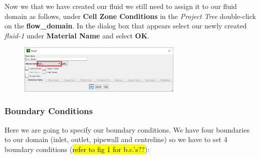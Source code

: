 \documentclass[11pt,a4paper,oneside,hidelinks]{scrartcl}
\newcommand\bfr[1]{\textcolor[rgb]{1,0.00,0.00}{\textbf{\textsf{#1}}}}
\begin{document}
Now we that we have created our fluid we still need to assign it to our fluid domain as follows, under \bfr{Cell Zone Conditions} in the \emph{Project Tree} double-click on the \bfr{flow\_domain}. In the dialog box that appears select our newly created \emph{fluid-1} under \bfr{Material Name} and select \bfr{OK}.
 \begin{figure}[H]
\begin{center}
\includegraphics[width=0.7\textwidth,clip]{apply_new_fluid.png}
\end{center}
\end{figure}


\subsubsection{Boundary Conditions}

Here we are going to specify our boundary conditions. We have four boundaries to our domain (inlet, outlet, pipewall and centreline) so we have to set 4 boundary conditions (\hl{refer to fig 1 for b.c.'s??}):
\end{document}
